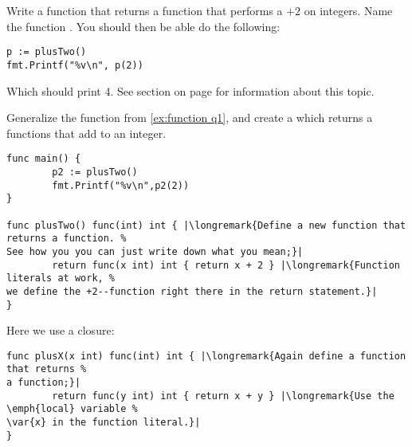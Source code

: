 \begin{Exercise}[title={Functions that return functions},difficulty=1]
\label{ex:function}
\Question\label{ex:function q1} Write a function that returns a function
that performs a $+2$ on integers. Name the function .
You should then be able do the following:
\begin{lstlisting}
p := plusTwo()
fmt.Printf("%v\n", p(2))
\end{lstlisting}
Which should print 4.
See section  on page \pageref{sec:callbacks} for information
about this topic.

\Question\label{ex:function q2} Generalize the function from \ref{ex:function q1},
and create a  which returns a functions that add  to an
integer.
\end{Exercise}

\begin{Answer}
\Question
\begin{lstlisting}
func main() {
        p2 := plusTwo()
        fmt.Printf("%v\n",p2(2))
}

func plusTwo() func(int) int { |\longremark{Define a new function that returns a function. %
See how you you can just write down what you mean;}|
        return func(x int) int { return x + 2 } |\longremark{Function literals at work, %
we define the +2--function right there in the return statement.}|
}
\end{lstlisting}
\showremarks

\Question
Here we use a closure:
\begin{lstlisting}
func plusX(x int) func(int) int { |\longremark{Again define a function that returns %
a function;}|
        return func(y int) int { return x + y } |\longremark{Use the \emph{local} variable %
\var{x} in the function literal.}|
}
\end{lstlisting}
\showremarks
\end{Answer}
